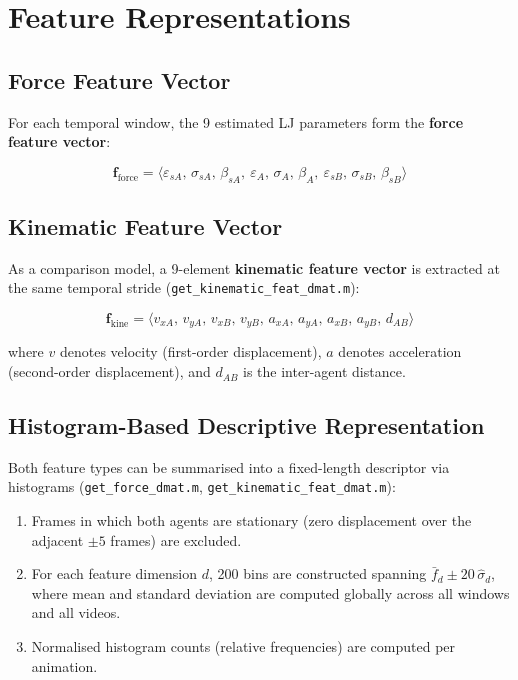 \documentclass[11pt,a4paper]{article}
\begin{document}
\section{Feature Representations}

\subsection{Force Feature Vector}

For each temporal window, the 9 estimated LJ parameters form the \textbf{force feature vector}:

\begin{equation}
    \mathbf{f}_{\text{force}} = \langle \varepsilon_{sA},\, \sigma_{sA},\, \beta_{sA},\ \varepsilon_A,\, \sigma_A,\, \beta_A,\ \varepsilon_{sB},\, \sigma_{sB},\, \beta_{sB} \rangle
\end{equation}

\subsection{Kinematic Feature Vector}

As a comparison model, a 9-element \textbf{kinematic feature vector} is extracted at the same temporal stride (\texttt{get\_kinematic\_feat\_dmat.m}):

\begin{equation}
    \mathbf{f}_{\text{kine}} = \langle v_{xA},\, v_{yA},\, v_{xB},\, v_{yB},\, a_{xA},\, a_{yA},\, a_{xB},\, a_{yB},\, d_{AB} \rangle
\end{equation}

\noindent where $v$ denotes velocity (first-order displacement), $a$ denotes acceleration (second-order displacement), and $d_{AB}$ is the inter-agent distance.

\subsection{Histogram-Based Descriptive Representation}

Both feature types can be summarised into a fixed-length descriptor via histograms (\texttt{get\_force\_dmat.m}, \texttt{get\_kinematic\_feat\_dmat.m}):

\begin{enumerate}
    \item Frames in which both agents are stationary (zero displacement over the adjacent $\pm 5$ frames) are excluded.
    \item For each feature dimension $d$, 200 bins are constructed spanning $\bar{f}_d \pm 20\,\hat{\sigma}_d$, where mean and standard deviation are computed globally across all windows and all videos.
    \item Normalised histogram counts (relative frequencies) are computed per animation.
\end{enumerate}
\end{document}
